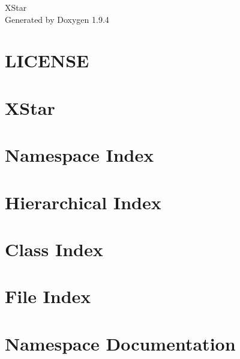 \documentclass[twoside]{book}
\newcommand{\+}{\discretionary{\mbox{\scriptsize$\hookleftarrow$}}{}{}}
\newcommand{\clearemptydoublepage}{%
    \newpage{\pagestyle{empty}\cleardoublepage}%
  }
\begin{document}
  \raggedbottom
    \hypersetup{pageanchor=false,
                bookmarksnumbered=true,
                pdfencoding=unicode
               }
  \begin{titlepage}
  \vspace*{7cm}
  \begin{center}%
  {\Large XStar}\\
  \vspace*{1cm}
  {\large Generated by Doxygen 1.9.4}\\
  \end{center}
  \end{titlepage}
  \clearemptydoublepage
  \tableofcontents
  \clearemptydoublepage
  \hypersetup{pageanchor=true}
\chapter{LICENSE}
\label{md__l_i_c_e_n_s_e}

\chapter{XStar}
\label{md__r_e_a_d_m_e}

\chapter{Namespace Index}

\chapter{Hierarchical Index}

\chapter{Class Index}

\chapter{File Index}

\chapter{Namespace Documentation}


\end{document}
